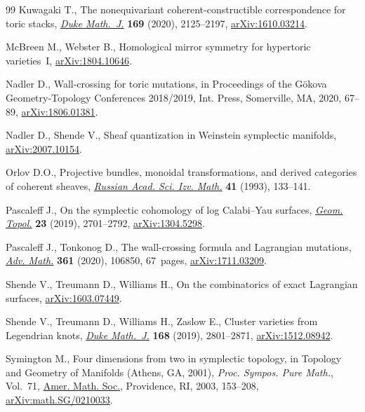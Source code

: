 \documentclass[pdftex]{sigma}%
\numberwithin{equation}{section}
\begin{document}
\begin{thebibliography}{99}
Kuwagaki T., The nonequivariant coherent-constructible correspondence for toric
 stacks, \href{https://doi.org/10.1215/00127094-2020-0011}{\textit{Duke Math.~J.}} \textbf{169} (2020), 2125--2197,
 \href{https://arxiv.org/abs/1610.03214}{arXiv:1610.03214}.

McBreen M., Webster B., Homological mirror symmetry for hypertoric
 varieties~{I}, \href{https://arxiv.org/abs/1804.10646}{arXiv:1804.10646}.

Nadler D., Wall-crossing for toric mutations, in Proceedings of the {G}\"okova
 {G}eometry-{T}opology {C}onferences 2018/2019, Int. Press, Somerville, MA,
 2020, 67--89, \href{https://arxiv.org/abs/1806.01381}{arXiv:1806.01381}.

Nadler D., Shende V., Sheaf quantization in {W}einstein symplectic manifolds,
 \href{https://arxiv.org/abs/2007.10154}{arXiv:2007.10154}.

Orlov D.O., Projective bundles, monoidal transformations, and derived
 categories of coherent sheaves, \href{https://doi.org/10.1070/IM1993v041n01ABEH002182}{\textit{Russian Acad. Sci. Izv. Math.}}
 \textbf{41} (1993), 133--141.

Pascaleff J., On the symplectic cohomology of log {C}alabi--{Y}au surfaces,
 \href{https://doi.org/10.2140/gt.2019.23.2701}{\textit{Geom. Topol.}} \textbf{23} (2019), 2701--2792, \href{https://arxiv.org/abs/1304.5298}{arXiv:1304.5298}.

Pascaleff J., Tonkonog D., The wall-crossing formula and {L}agrangian
 mutations, \href{https://doi.org/10.1016/j.aim.2019.106850}{\textit{Adv. Math.}} \textbf{361} (2020), 106850, 67~pages,
 \href{https://arxiv.org/abs/1711.03209}{arXiv:1711.03209}.

Shende V., Treumann D., Williams H., On the combinatorics of exact {L}agrangian
 surfaces, \href{https://arxiv.org/abs/1603.07449}{arXiv:1603.07449}.

Shende V., Treumann D., Williams H., Zaslow E., Cluster varieties from
 {L}egendrian knots, \href{https://doi.org/10.1215/00127094-2019-0027}{\textit{Duke Math.~J.}} \textbf{168} (2019), 2801--2871,
 \href{https://arxiv.org/abs/1512.08942}{arXiv:1512.08942}.

Symington M., Four dimensions from two in symplectic topology, in Topology and
 Geometry of Manifolds ({A}thens, {GA}, 2001), \textit{Proc. Sympos. Pure
 Math.}, Vol.~71, \href{https://doi.org/10.1090/pspum/071/2024634}{Amer. Math. Soc.}, Providence, RI, 2003, 153--208,
 \href{https://arxiv.org/abs/math.SG/0210033}{arXiv:math.SG/0210033}.


\end{thebibliography}
\end{document}

